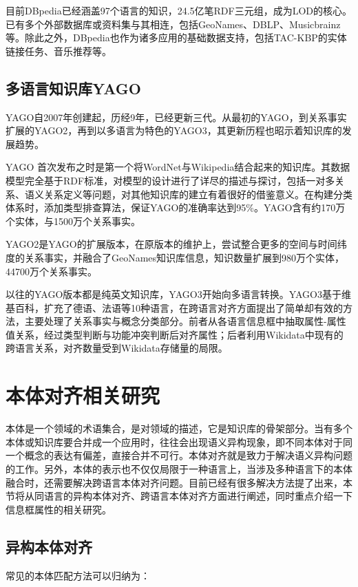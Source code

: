 目前DBpedia已经涵盖97个语言的知识，24.5亿笔RDF三元组，成为LOD的核心。已有多个外部数据库或资料集与其相连，包括GeoNames、DBLP、Musicbrainz等。除此之外，DBpedia也作为诸多应用的基础数据支持，包括TAC-KBP\cite{mendes2011evaluating}的实体链接任务、音乐推荐\cite{passant2010dbrec}等。

\subsection{多语言知识库YAGO}
YAGO自2007年创建起，历经9年，已经更新三代。从最初的YAGO\cite{suchanek2007yago,suchanek2008yago}，到关系事实扩展的YAGO2\cite{hoffart2013yago2}，再到以多语言为特色的YAGO3\cite{mahdisoltani2014yago3}，其更新历程也昭示着知识库的发展趋势。

{\heiti YAGO} 首次发布之时是第一个将WordNet\cite{fellbaum1998wordnet}与Wikipedia结合起来的知识库。其数据模型完全基于RDF标准，对模型的设计进行了详尽的描述与探讨，包括一对多关系、语义关系定义等问题，对其他知识库的建立有着很好的借鉴意义。在构建分类体系时，添加类型排查算法，保证YAGO的准确率达到95\%。YAGO含有约170万个实体，与1500万个关系事实。

{\heiti YAGO2}是YAGO的扩展版本，在原版本的维护上，尝试整合更多的空间与时间纬度的关系事实，并融合了GeoNames知识库信息，知识数量扩展到980万个实体，44700万个关系事实。

以往的YAGO版本都是纯英文知识库，{\heiti YAGO3}开始向多语言转换。YAGO3基于维基百科，扩充了德语、法语等10种语言，在跨语言对齐方面提出了简单却有效的方法，主要处理了关系事实与概念分类部分。前者从各语言信息框中抽取属性-属性值关系，经过类型判断与功能冲突判断后对齐属性；后者利用Wikidata中现有的跨语言关系，对齐数量受到Wikidata存储量的局限。

\section{本体对齐相关研究}
\label{sec:ontology-research}

本体是一个领域的术语集合，是对领域的描述，它是知识库的骨架部分。当有多个本体或知识库要合并成一个应用时，往往会出现{\heiti 语义异构}现象，即不同本体对于同一个概念的表达有偏差，直接合并不可行。本体对齐就是致力于解决语义异构问题的工作。另外，本体的表示也不仅仅局限于一种语言上，当涉及多种语言下的本体融合时，还需要解决跨语言本体对齐问题。目前已经有很多解决方法提了出来，本节将从同语言的异构本体对齐、跨语言本体对齐方面进行阐述，同时重点介绍一下信息框属性的相关研究。

\subsection{异构本体对齐}
常见的本体匹配方法可以归纳为：


